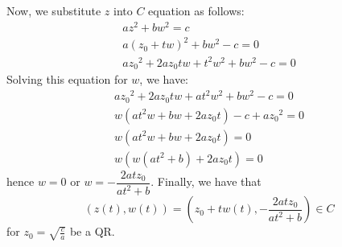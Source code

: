 \documentclass[letterpaper,11pt]{article}
\begin{document}
Now, we substitute $z$ into $C$ equation as follows:
\begin{eqnarray*}
 az^2+bw^2 = c\\
 a(z_0+tw)^2+bw^2- c = 0 \\
 a{z_0}^2+2a{z_0}tw+t^2w^2+bw^2 - c = 0
\end{eqnarray*}
Solving this equation for $w$, we have:
\begin{eqnarray*}
 a{z_0}^2+2a{z_0}tw+at^2w^2+bw^2 - c = 0 \\
 w( at^2w+bw+2a{z_0}t)-c+a{z_0}^2 = 0 \\
 w( at^2w+bw+2a{z_0}t)= 0 \\
 w( w( at^2+b) + 2a{z_0}t)= 0 
\end{eqnarray*}
hence $w=0$ or $w = -\dfrac{2atz_0}{at^2+b}$.
Finally, we have that
\begin{equation}
(z(t),w(t)) = \left( z_0+tw(t),-\dfrac{2atz_0}{at^2+b} \right)\in C 
\end{equation}
for $z_0=\sqrt{\frac{c}{a}}$ be a QR.
\end{document}
